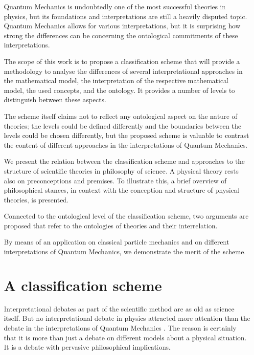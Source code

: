 \documentclass{article}
\begin{document}
Quantum Mechanics is undoubtedly one of the most successful theories in physics, but its foundations and interpretations are still a heavily disputed topic. Quantum Mechanics allows for various interpretations, but it is surprising how strong the differences can be concerning the ontological commitments of these interpretations. \newline

The scope of this work is to propose a classification scheme that will provide a methodology to analyse the differences of several interpretational approaches in the mathematical model, the interpretation of the respective mathematical model, the used concepts, and the ontology. It provides a number of levels to distinguish between these aspects. \newline

The scheme itself claims not to reflect any ontological aspect on the nature of theories; the levels could be defined differently and the boundaries between the levels could be chosen differently, but the proposed scheme is valuable to contrast the content of different approaches in the interpretations of Quantum Mechanics. \newline

We present the relation between the classification scheme and approaches to the structure of scientific theories in philosophy of science. A physical theory rests also on preconceptions and premises. To illustrate this, a brief overview of philosophical stances, in context with the conception and structure of physical theories, is presented. \newline

Connected to the ontological level of the classification scheme, two arguments are proposed that refer to the ontologies of theories and their interrelation. \newline

By means of an application on classical particle mechanics and on different interpretations of Quantum Mechanics, we demonstrate the merit of the scheme. 

\newpage

\section{A classification scheme}

Interpretational debates as part of the scientific method are as old as science itself. But no interpretational debate in physics attracted more attention than the debate in the interpretations of Quantum Mechanics \cite[]{landsman2006champions}. The reason is certainly that it is more than just a debate on different models about a physical situation. It is a debate with pervasive philosophical implications. \newline
\end{document}
